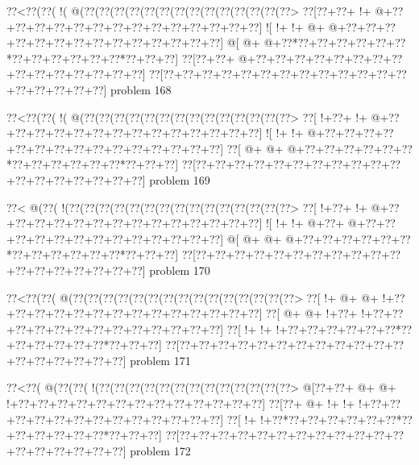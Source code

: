 \vbox{\vbox{\goo
\0??<\0??(\0??(\- !(\- @(\0??(\0??(\0??(\0??(\0??(\0??(\0??(\0??(\0??(\0??(\0??(\0??(\0??(\0??>
\0??[\0??+\0??+\- !+\- @+\0??+\0??+\0??+\0??+\0??+\0??+\0??+\0??+\0??+\0??+\0??+\0??+\0??+\0??]
\- ![\- !+\- !+\- @+\- @+\0??+\0??+\0??+\0??+\0??+\0??+\0??+\0??+\0??+\0??+\0??+\0??+\0??+\0??]
\- @[\- @+\- @+\0??*\0??+\0??+\0??+\0??+\0??+\0??*\0??+\0??+\0??+\0??+\0??+\0??*\0??+\0??+\0??]
\0??[\0??+\0??+\- @+\0??+\0??+\0??+\0??+\0??+\0??+\0??+\0??+\0??+\0??+\0??+\0??+\0??+\0??+\0??]
\0??[\0??+\0??+\0??+\0??+\0??+\0??+\0??+\0??+\0??+\0??+\0??+\0??+\0??+\0??+\0??+\0??+\0??+\0??]
}
\hfil problem 168\hfil\break
}



\vbox{\vbox{\goo
\0??<\0??(\0??(\- !(\- @(\0??(\0??(\0??(\0??(\0??(\0??(\0??(\0??(\0??(\0??(\0??(\0??(\0??(\0??>
\0??[\- !+\0??+\- !+\- @+\0??+\0??+\0??+\0??+\0??+\0??+\0??+\0??+\0??+\0??+\0??+\0??+\0??+\0??]
\- ![\- !+\- !+\- @+\0??+\0??+\0??+\0??+\0??+\0??+\0??+\0??+\0??+\0??+\0??+\0??+\0??+\0??+\0??]
\0??[\- @+\- @+\- @+\0??+\0??+\0??+\0??+\0??+\0??*\0??+\0??+\0??+\0??+\0??+\0??*\0??+\0??+\0??]
\0??[\0??+\0??+\0??+\0??+\0??+\0??+\0??+\0??+\0??+\0??+\0??+\0??+\0??+\0??+\0??+\0??+\0??+\0??]
}
\hfil problem 169\hfil\break
}



\vbox{\vbox{\goo
\0??<\- @(\0??(\- !(\0??(\0??(\0??(\0??(\0??(\0??(\0??(\0??(\0??(\0??(\0??(\0??(\0??(\0??(\0??>
\0??[\- !+\0??+\- !+\- @+\0??+\0??+\0??+\0??+\0??+\0??+\0??+\0??+\0??+\0??+\0??+\0??+\0??+\0??]
\- ![\- !+\- !+\- @+\0??+\- @+\0??+\0??+\0??+\0??+\0??+\0??+\0??+\0??+\0??+\0??+\0??+\0??+\0??]
\- @[\- @+\- @+\- @+\0??+\0??+\0??+\0??+\0??+\0??*\0??+\0??+\0??+\0??+\0??+\0??*\0??+\0??+\0??]
\0??[\0??+\0??+\0??+\0??+\0??+\0??+\0??+\0??+\0??+\0??+\0??+\0??+\0??+\0??+\0??+\0??+\0??+\0??]
}
\hfil problem 170\hfil\break
}



\vbox{\vbox{\goo
\0??<\0??(\0??(\- @(\0??(\0??(\0??(\0??(\0??(\0??(\0??(\0??(\0??(\0??(\0??(\0??(\0??(\0??(\0??>
\0??[\- !+\- @+\- @+\- !+\0??+\0??+\0??+\0??+\0??+\0??+\0??+\0??+\0??+\0??+\0??+\0??+\0??+\0??]
\0??[\- @+\- @+\- !+\0??+\- !+\0??+\0??+\0??+\0??+\0??+\0??+\0??+\0??+\0??+\0??+\0??+\0??+\0??]
\0??[\- !+\- !+\- !+\0??+\0??+\0??+\0??+\0??+\0??*\0??+\0??+\0??+\0??+\0??+\0??*\0??+\0??+\0??]
\0??[\0??+\0??+\0??+\0??+\0??+\0??+\0??+\0??+\0??+\0??+\0??+\0??+\0??+\0??+\0??+\0??+\0??+\0??]
}
\hfil problem 171\hfil\break
}



\vbox{\vbox{\goo
\0??<\0??(\- @(\0??(\0??(\- !(\0??(\0??(\0??(\0??(\0??(\0??(\0??(\0??(\0??(\0??(\0??(\0??(\0??>
\- @[\0??+\0??+\- @+\- @+\- !+\0??+\0??+\0??+\0??+\0??+\0??+\0??+\0??+\0??+\0??+\0??+\0??+\0??]
\0??[\0??+\- @+\- !+\- !+\- !+\0??+\0??+\0??+\0??+\0??+\0??+\0??+\0??+\0??+\0??+\0??+\0??+\0??]
\0??[\- !+\- !+\0??*\0??+\0??+\0??+\0??+\0??+\0??*\0??+\0??+\0??+\0??+\0??+\0??*\0??+\0??+\0??]
\0??[\0??+\0??+\0??+\0??+\0??+\0??+\0??+\0??+\0??+\0??+\0??+\0??+\0??+\0??+\0??+\0??+\0??+\0??]
}
\hfil problem 172\hfil\break
}




